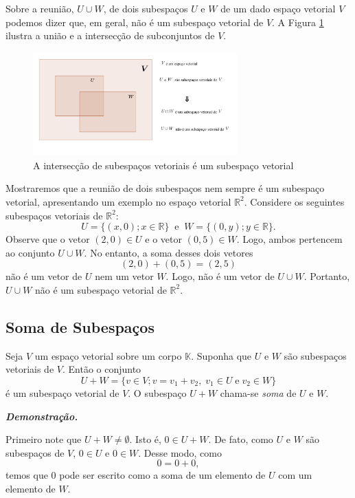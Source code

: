 Sobre a reunião, $U \cup W$, de dois subespaços $U$ e $W$ de um dado espaço vetorial $V$ podemos dizer que, em geral, não é um subespaço vetorial de $V$. A Figura \ref{fig:intersect} ilustra a união e a intersecção de subconjuntos de $V$.

\begin{figure}[h!]
	\center
	\includegraphics[width=0.7\textwidth]{chapters/subespacos_vetoriais/img/intersect}
	\caption{\footnotesize{A intersecção de subespaços vetoriais é um subespaço vetorial}}
	\label{fig:intersect}
\end{figure}

Mostraremos que a reunião de dois subespaços nem sempre é um subespaço vetorial, apresentando um exemplo no espaço vetorial $\mathbb{R}^2$. Considere os seguintes subespaços vetoriais de $\mathbb{R}^2$:  $$U=\{(x, 0); x \in \mathbb{R}\} \;\;\text{e} \;\;  W=\{(0, y); y \in \mathbb{R} \}.$$ Observe que o vetor $(2,0) \in U$  e o vetor $(0,5) \in W$. Logo, ambos pertencem ao conjunto  $U \cup W$. No entanto, a soma desses dois vetores $$(2,0)+(0,5)=(2,5)$$ não é um vetor de $U$ nem um vetor $W$. Logo, não é um vetor de $U \cup W$. Portanto, $U \cup W$ não é um subespaço vetorial de $\mathbb{R}^2$.







\subsection{Soma de Subespaços}
Seja  $V$ um espaço vetorial sobre um corpo $\mathbb{K}$. Suponha que $U$ e $W$ são  subespaços vetoriais de $V$. Então o conjunto
$$U+W=\{ v \in V; v=v_1+v_2, \; v_1 \in U \; \text{e} \; v_2 \in W \} $$ é um subespaço vetorial de $V$. O subespaço $U+W$ chama-se \textit{ soma} de $U$ e $W$.

\textbf{\textit{Demonstração.}}

Primeiro note que $U+W \neq \emptyset$. Isto é, $0 \in U+W$. De fato,  como $U$ e $W$ são subespaços de $V$, $0 \in U$ e $0 \in W$. Desse modo, como  $$0=0+0,$$ temos que $0$ pode ser escrito como a soma de um elemento de $U$ com um elemento de $W$.

